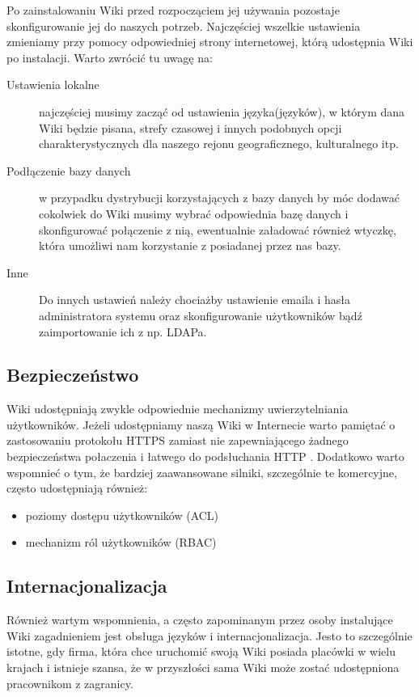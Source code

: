 \documentclass{article}
\begin{document}
		Po zainstalowaniu Wiki przed rozpocząciem jej używania pozostaje skonfigurowanie jej do naszych potrzeb. Najczęściej wszelkie ustawienia zmieniamy przy pomocy odpowiedniej strony internetowej, którą udostępnia Wiki po instalacji. Warto zwrócić tu uwagę na:
		\begin{description}
			\item[Ustawienia lokalne] najczęściej musimy zacząć od ustawienia języka(języków), w którym dana Wiki będzie pisana, strefy czasowej i innych podobnych opcji charakterystycznych dla naszego rejonu geograficznego, kulturalnego itp.
			\item[Podłączenie bazy danych] w przypadku dystrybucji korzystających z bazy danych by móc dodawać cokolwiek do Wiki musimy wybrać odpowiednia bazę danych i skonfigurować połączenie z nią, ewentualnie załadować również wtyczkę, która umożliwi nam korzystanie z posiadanej przez nas bazy.
			\item[Inne] Do innych ustawień należy chociażby ustawienie emaila i hasła administratora systemu oraz skonfigurowanie użytkowników bądź zaimportowanie ich z np. LDAPa.
		\end{description}
	\subsection{Bezpieczeństwo}
		Wiki udostępniają zwykle odpowiednie mechanizmy uwierzytelniania użytkowników. Jeżeli udostępniamy naszą Wiki w Internecie warto pamiętać o zastosowaniu protokołu HTTPS zamiast nie zapewniającego żadnego bezpieczeństwa połaczenia i łatwego do podsłuchania HTTP
.
		Dodatkowo warto wspomnieć o tym, że bardziej zaawansowane silniki, szczególnie te komercyjne, często udostępniają również:
		\begin{itemize}
			\item poziomy dostępu użytkowników (ACL)
			\item mechanizm ról użytkowników (RBAC)
		\end{itemize}
	\subsection{Internacjonalizacja}
		Również wartym wspomnienia, a często zapominanym przez osoby instalujące Wiki zagadnieniem jest obsługa języków i internacjonalizacja. Jesto to szczególnie istotne, gdy firma, która chce uruchomić swoją Wiki posiada placówki w wielu krajach i istnieje szansa, że w przyszłości sama Wiki może zostać udostępniona pracownikom z zagranicy.
\end{document}
